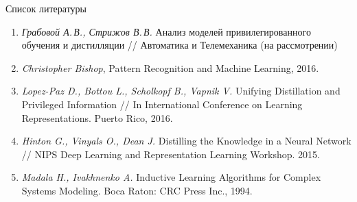 \documentclass[9pt,pdf,hyperref={unicode}]{beamer}
\begin{document}
\begin{frame}{Список литературы}
\justifying
\begin{enumerate}
	\item \textit{Грабовой А.\,В., Стрижов В.\,В.} Анализ моделей привилегированного обучения и дистилляции // Автоматика и Телемеханика (на рассмотрении)
	\item \textit{Christopher Bishop}, Pattern Recognition and Machine Learning, 2016.
	\item \textit{Lopez-Paz D., Bottou L., Scholkopf B., Vapnik V.} Unifying Distillation and Privileged Information // In International Conference on Learning Representations. Puerto Rico, 2016.
	\item \textit{Hinton G., Vinyals O., Dean J.} Distilling the Knowledge in a Neural Network // NIPS Deep Learning and Representation Learning Workshop. 2015.
	\item \textit{Madala H., Ivakhnenko A.} Inductive Learning Algorithms for Complex Systems Modeling. Boca Raton: CRC Press Inc., 1994.
\end{enumerate}
\end{frame}

\end{document}
